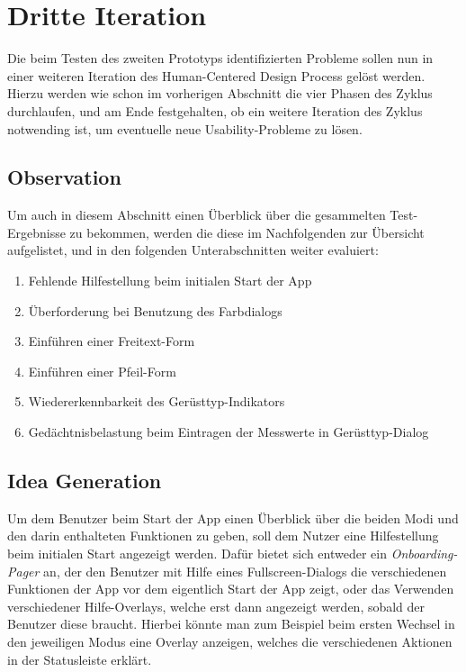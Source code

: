 \section{Dritte Iteration}
Die beim Testen des zweiten Prototyps identifizierten Probleme sollen nun in einer weiteren Iteration des Human-Centered Design Process gelöst werden.
Hierzu werden wie schon im vorherigen Abschnitt die vier Phasen des Zyklus durchlaufen, und am Ende festgehalten, ob ein weitere Iteration des Zyklus notwending ist, um eventuelle neue Usability-Probleme zu lösen.
\subsection{Observation}\label{subsec:prob3}

Um auch in diesem Abschnitt einen Überblick über die gesammelten Test-Ergebnisse zu bekommen, werden die diese im Nachfolgenden zur Übersicht aufgelistet, und in den folgenden Unterabschnitten weiter evaluiert:

\begin{enumerate}
  \item Fehlende Hilfestellung beim initialen Start der App
  \item Überforderung bei Benutzung des Farbdialogs
  \item Einführen einer Freitext-Form
  \item Einführen einer Pfeil-Form 
  \item Wiedererkennbarkeit des Gerüsttyp-Indikators
  \item Gedächtnisbelastung beim Eintragen der Messwerte in Gerüsttyp-Dialog
\end{enumerate}

\subsection{Idea Generation}\label{subsec:idea3}
Um dem Benutzer beim Start der App einen Überblick über die beiden Modi und den darin enthalteten Funktionen zu geben, soll dem Nutzer eine Hilfestellung beim initialen Start angezeigt werden.
Dafür bietet sich entweder ein \emph{Onboarding-Pager} an, der den Benutzer mit Hilfe eines Fullscreen-Dialogs die verschiedenen Funktionen der App vor dem eigentlich Start der App zeigt, oder das Verwenden verschiedener Hilfe-Overlays, welche erst dann angezeigt werden, sobald der Benutzer diese braucht.
Hierbei könnte man zum Beispiel beim ersten Wechsel in den jeweiligen Modus eine Overlay anzeigen, welches die verschiedenen Aktionen in der Statusleiste erklärt. \\

